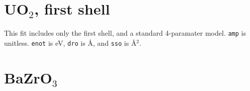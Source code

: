 \documentclass{article}
\let\stdsection\section
\renewcommand\section{\newpage\stdsection}
\begin{document}
\renewcommand{\feffMaterial}{UO2}
\renewcommand{\feffRone}{3}
\renewcommand{\feffRtwo}{4}
\renewcommand{\feffRthree}{5}
\renewcommand{\feffRfour}{5.5}
\renewcommand{\feffRfive}{6}
\renewcommand{\feffFirst}{}

\scriptsize

\scfsevenplots


\section{UO$_2$, first shell}

\normalsize
This fit includes only the first shell, and a standard 4-paramater
model.  \texttt{amp} is unitless.  \texttt{enot} is eV, \texttt{dro}
is \AA, and \texttt{sso} is \AA$^2$.

\renewcommand{\feffFirst}{_1st}

\small

\scfsevenplots





\section{BaZrO$_3$}
\normalsize
\end{document}
